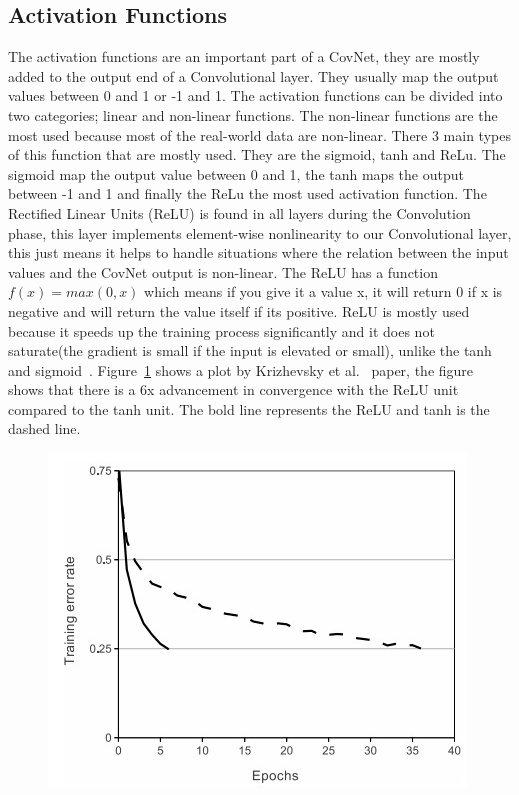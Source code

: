 \documentclass[12pt, a4paper,oneside]{report}
\begin{document}
\subsection{Activation Functions}
The activation functions are an important part of a CovNet, they are mostly added to the output end of a Convolutional layer. They usually map the output values between 0 and 1 or -1 and 1. The activation functions can be divided into two categories; linear and non-linear functions. The non-linear functions are the most used because most of the real-world data are non-linear. There 3 main types of this function that are mostly used. They are the sigmoid, tanh and ReLu. The sigmoid map the output value between 0 and 1, the tanh maps the output between -1 and 1 and finally the ReLu the most used activation function. The Rectified Linear Units (ReLU) is found in all layers during the Convolution phase, this layer implements element-wise nonlinearity to our Convolutional layer, this just means it helps to handle situations where the relation between the input values and the CovNet output is non-linear. The ReLU has a function \(f(x) = max(0,x)\) which means if you give it a value x, it will return 0 if x is negative and will return the value itself if its positive. ReLU is mostly used because it speeds up the training process significantly and it does not saturate(the gradient is small if the input is elevated or small), unlike the tanh and sigmoid~\cite{relu}. Figure~\ref{fig:relu} shows a plot by Krizhevsky et al.~\cite{krizhevsky2012imagenet} paper, the figure shows that there is a 6x advancement in convergence with the ReLU unit compared to the tanh unit. The bold line represents the ReLU and tanh is the dashed line.

\begin{figure}
	\includegraphics [scale=0.9] {relu}
	\label{fig:relu}
\end{figure}
\end{document}
